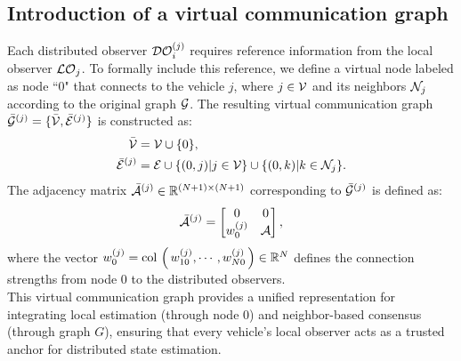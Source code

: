 \subsection{Introduction of a virtual communication graph}
\vspace*{-0.3cm}
Each distributed observer $\mathcal{DO}_{i}^{(j)}$ requires reference information from the local observer $\mathcal{LO}_{j}$.
    To formally include this reference, we define a virtual node labeled as node ``0" that connects to the vehicle $j$, where $j \in \mathcal{V}$ and its neighbors $\mathcal{N}_{j}$ according to the original graph $\mathcal{G}$. 
    The resulting virtual communication graph $\bar{\mathcal{G}}^{(j)} = \{ \bar{\mathcal{V}}, \bar{\mathcal{E}}^{(j)} \}$ is constructed as:
    \begin{equation}
        \begin{aligned}
            \bar{\mathcal{V}} &= \mathcal{V} \cup \{0\}, \\
            \bar{\mathcal{E}}^{(j)} &= \mathcal{E} \cup \{ (0,j) | j \in \mathcal{V} \} \cup \{ (0,k) | k \in \mathcal{N}_{j} \}.
        \end{aligned}
    \end{equation}
    The adjacency matrix $\bar{\mathcal{A}}^{(j)}  \in \mathbb{R}^{(N+1) \times (N+1)}$ corresponding to $\bar{\mathcal{G}}^{(j)}$ is defined as:
    \begin{equation}
        \bar{\mathcal{A}}^{(j)}  = \begin{bmatrix} 0 & 0 \\
                        w_{0}^{(j)} & \mathcal{A} \end{bmatrix},
    \end{equation}  
    where the vector $w_{0}^{(j)} = \mathop{{\rm col}\,\left(\,w_{10}^{(j)}, \cdots, w_{N0}^{(j)}\,\right)}  \in \mathbb{R}^{N}$ defines the connection strengths from node $0$ to the distributed observers.
    \\
    This virtual communication graph provides a unified representation for integrating local estimation (through node $0$) and neighbor-based consensus (through graph $G$), ensuring that every vehicle's local observer acts as a trusted anchor for distributed state estimation.








